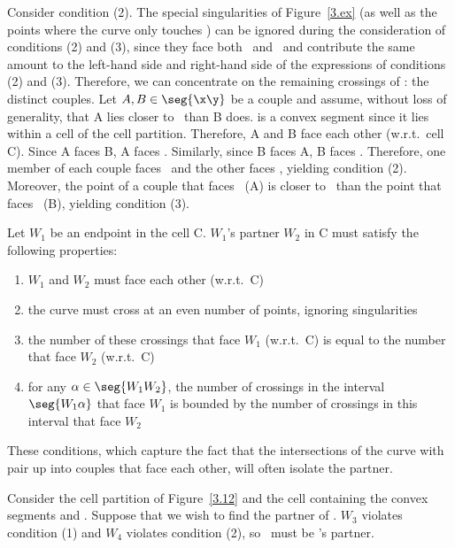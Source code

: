 Consider condition (2).
The special singularities of Figure~\ref{3.ex} (as well as the points where
the curve only touches ) can be ignored during 
the consideration of conditions (2) and (3), since they face both \x\ and 
\y\ and contribute the same amount to the left-hand side and right-hand side 
of the expressions of conditions (2) and (3).
Therefore, we can concentrate on the remaining crossings of \seg{\x\y}:
the distinct couples.
Let $A,B\in \seg{\x\y}$ be a couple and assume, without loss of generality, 
that A lies closer to \x\ than B does.
 is a convex segment since it lies within a cell of the cell
partition.
Therefore, A and B face each other (w.r.t.\ cell C).
Since A faces B, A faces \y.
Similarly, since B faces A, B faces \x.
Therefore, one member of each couple faces \x\ and the other faces \y,
yielding condition (2).
Moreover, the point of a couple that faces \y\ (A) is closer to \x\ than the point 
that faces \x\ (B), yielding condition (3).
\QED
%
\begin{corollary}
\label{Cp}
Let $W_{1}$ be an endpoint in the cell C.
$W_{1}$'s partner $W_{2}$ in C must satisfy the following properties:
\begin{enumerate}
\item 
	$W_{1}$ and $W_{2}$ must face each other (w.r.t.\ C)
\item
	the curve must cross  at an even number of points,
	ignoring singularities
\item 	
	the number of these crossings that face $W_{1}$ (w.r.t.\ C)
	is equal to the number that face $W_{2}$ (w.r.t.\ C)
\item
	for any $\alpha \in \seg{W_{1}W_{2}}$, the number of crossings in the
	interval $\seg{W_{1}\alpha}$ that face $W_{1}$ is bounded by
	the number of crossings in this interval that face $W_{2}$
\end{enumerate}
\end{corollary}

These conditions, which capture the fact that the intersections of the curve 
with  pair up into couples that face each other, will often isolate 
the partner.

\begin{example}
Consider the cell partition of Figure~\ref{3.12} and the cell containing
the convex segments \arc{\wo\wt} and .
Suppose that we wish to find the partner of \wo.
$W_{3}$ violates condition (1) and $W_{4}$ violates condition (2), 
so \wt\ must be \wo's partner.
\end{example}

